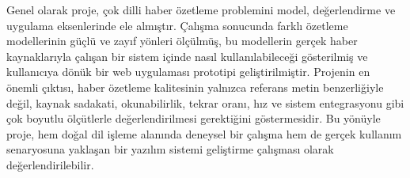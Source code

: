 Genel olarak proje, çok dilli haber özetleme problemini model, değerlendirme ve uygulama eksenlerinde ele almıştır. Çalışma sonucunda farklı özetleme modellerinin güçlü ve zayıf yönleri ölçülmüş, bu modellerin gerçek haber kaynaklarıyla çalışan bir sistem içinde nasıl kullanılabileceği gösterilmiş ve kullanıcıya dönük bir web uygulaması prototipi geliştirilmiştir. Projenin en önemli çıktısı, haber özetleme kalitesinin yalnızca referans metin benzerliğiyle değil, kaynak sadakati, okunabilirlik, tekrar oranı, hız ve sistem entegrasyonu gibi çok boyutlu ölçütlerle değerlendirilmesi gerektiğini göstermesidir. Bu yönüyle proje, hem doğal dil işleme alanında deneysel bir çalışma hem de gerçek kullanım senaryosuna yaklaşan bir yazılım sistemi geliştirme çalışması olarak değerlendirilebilir.